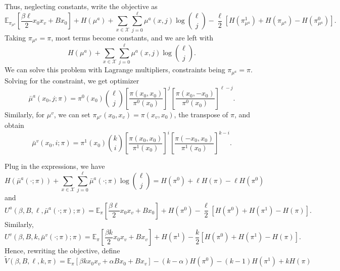 \documentclass[12pt]{article}
\numberwithin{equation}{section}
\begin{document}
Thus, neglecting constants, write the objective as
\begin{equation*}
    \mathbb{E}_{\pi_{\mu^a}}\left[\frac{\beta\ell}{2}x_0 x_v+Bx_0\right] + H(\mu^a) + \sum_{x\in\mathcal{X}}\sum_{j=0}^\ell\mu^a(x, j)\log{\ell\choose j} - \frac\ell2\left[H(\pi_{\mu^a}^1)+H(\pi_{\mu^a})-H(\pi_{\mu^a}^0)\right].
\end{equation*}
Taking $\pi_{\mu^a}=\pi$, most terms become constants, and we are left with
\begin{equation*}
    H(\mu^a) + \sum_{x\in\mathcal{X}}\sum_{j=0}^\ell\mu^a(x, j)\log{\ell\choose j}.
\end{equation*}
We can solve this problem with Lagrange multipliers, constraints being $\pi_{\mu^a}=\pi$. Solving for the constraint, we get optimizer
\begin{equation}
    \bar{\mu}^a(x_0, j; \pi) = \pi^0(x_0){\ell\choose j}\left[\frac{\pi(x_0,x_0)}{\pi^0(x_0)}\right]^j\left[\frac{\pi(x_0,-x_0)}{\pi^0(x_0)}\right]^{\ell-j}.
\end{equation}
Similarly, for $\mu^v$, we can set $\pi_{\mu^v}(x_0, x_v) = \pi(x_v, x_0)$, the transpose of $\pi$, and obtain
\begin{equation}
    \bar{\mu}^v(x_0, i; \pi) = \pi^1(x_0){k\choose i}\left[\frac{\pi(x_0,x_0)}{\pi^1(x_0)}\right]^i\left[\frac{\pi(-x_0,x_0)}{\pi^1(x_0)}\right]^{k-i}.
\end{equation}

Plug in the expressions, we have
\begin{equation*}
    H(\bar{\mu}^a(\cdot; \pi)) + \sum_{x\in\mathcal{X}}\sum_{j=0}^\ell\bar{\mu}^a(\cdot; \pi)\log{\ell\choose j} = H(\pi^0)+ \ell H(\pi) - \ell H(\pi^0)
\end{equation*}
and
\begin{equation}
    U^a(\beta, B, \ell, \bar{\mu}^a(\cdot; \pi); \pi) = \mathbb{E}_{\pi}\left[\frac{\beta\ell}{2}x_0 x_v+Bx_0\right]+H(\pi^0)-\frac\ell2\left[H(\pi^0)+H(\pi^1)-H(\pi)\right].
\end{equation}
Similarly,
\begin{equation}
    U^v(\beta, B, k, \bar{\mu}^v(\cdot; \pi); \pi) = \mathbb{E}_{\pi}\left[\frac{\beta k}{2}x_0 x_v+Bx_v\right]+H(\pi^1)-\frac{k}{2}\left[H(\pi^0)+H(\pi^1)-H(\pi)\right].
\end{equation}
Hence, rewriting the objective, define
\begin{equation}
    \widetilde{V}(\beta, B, \ell, k, \pi) = \mathbb{E}_{\pi}\left[\beta k x_0 x_v + \alpha Bx_0 + B x_v\right] - (k-\alpha)H(\pi^0) - (k-1)H(\pi^1) + kH(\pi)
\end{equation}
\end{document}
